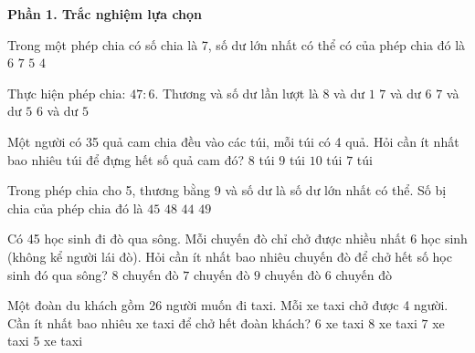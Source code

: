 \textbf{Phần 1. Trắc nghiệm lựa chọn}

\begin{ex} %
Trong một phép chia có số chia là 7, số dư lớn nhất có thể có của phép chia đó là
\choice
{\True $6$}
{$7$}
{$5$}
{$4$}
\end{ex}

\begin{ex} %
Thực hiện phép chia: $47 : 6$. Thương và số dư lần lượt là
\choice
{$8$ và dư $1$}
{$7$ và dư $6$}
{\True $7$ và dư $5$}
{$6$ và dư $5$}
\end{ex}

\begin{ex} %
Một người có 35 quả cam chia đều vào các túi, mỗi túi có 4 quả. Hỏi cần ít nhất bao nhiêu túi để đựng hết số quả cam đó?
\choice
{$8$ túi}
{\True $9$ túi}
{$10$ túi}
{$7$ túi}
\end{ex}

\begin{ex} %
Trong phép chia cho 5, thương bằng 9 và số dư là số dư lớn nhất có thể. Số bị chia của phép chia đó là
\choice
{$45$}
{$48$}
{$44$}
{\True $49$}
\end{ex}

\begin{ex} %
Có 45 học sinh đi đò qua sông. Mỗi chuyến đò chỉ chở được nhiều nhất 6 học sinh (không kể người lái đò). Hỏi cần ít nhất bao nhiêu chuyến đò để chở hết số học sinh đó qua sông?
\choice
{\True $8$ chuyến đò}
{$7$ chuyến đò}
{$9$ chuyến đò}
{$6$ chuyến đò}
\end{ex}

\begin{ex} %
Một đoàn du khách gồm 26 người muốn đi taxi. Mỗi xe taxi chở được 4 người. Cần ít nhất bao nhiêu xe taxi để chở hết đoàn khách?
\choice
{$6$ xe taxi}
{$8$ xe taxi}
{\True $7$ xe taxi}
{$5$ xe taxi}
\end{ex}

